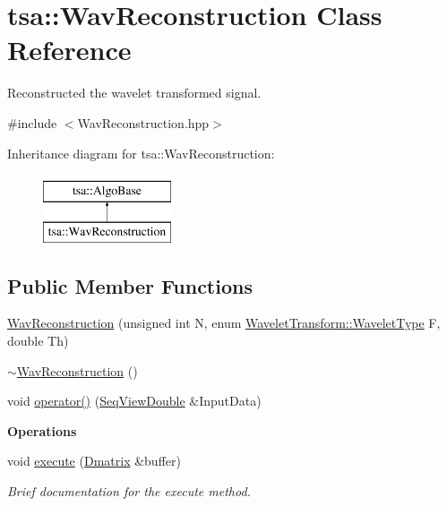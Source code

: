 \hypertarget{classtsa_1_1_wav_reconstruction}{}\section{tsa\+:\+:Wav\+Reconstruction Class Reference}
\label{classtsa_1_1_wav_reconstruction}


Reconstructed the wavelet transformed signal.  




{\ttfamily \#include $<$Wav\+Reconstruction.\+hpp$>$}

Inheritance diagram for tsa\+:\+:Wav\+Reconstruction\+:\begin{figure}[H]
\begin{center}
\leavevmode
\includegraphics[height=2.000000cm]{classtsa_1_1_wav_reconstruction}
\end{center}
\end{figure}
\subsection*{Public Member Functions}
\begin{DoxyCompactItemize}
\item 
\hyperlink{classtsa_1_1_wav_reconstruction_a30e49dd92bc216fdc8a8411914bac3da}{Wav\+Reconstruction} (unsigned int N, enum \hyperlink{classtsa_1_1_wavelet_transform_a5a529de70e0004333fcf23b9cca88ce7}{Wavelet\+Transform\+::\+Wavelet\+Type} F, double Th)
\item 
\hyperlink{classtsa_1_1_wav_reconstruction_a98992576615196547b63822980a1c9d3}{$\sim$\+Wav\+Reconstruction} ()
\item 
void \hyperlink{classtsa_1_1_wav_reconstruction_af5a0010f467f436732548165315efeb0}{operator()} (\hyperlink{namespacetsa_ac599574bcc094eda25613724b8f3ca9e}{Seq\+View\+Double} \&Input\+Data)
\end{DoxyCompactItemize}
\begin{Indent}\textbf{ Operations}\par
\begin{DoxyCompactItemize}
\item 
void \hyperlink{classtsa_1_1_wav_reconstruction_abf80b87f146d0557af51f4e5ec60580e}{execute} (\hyperlink{namespacetsa_ad260cd21c1891c4ed391fe788569aba4}{Dmatrix} \&buffer)
\begin{DoxyCompactList}\small\item\em Brief documentation for the execute method. \end{DoxyCompactList}\end{DoxyCompactItemize}
\end{Indent}
